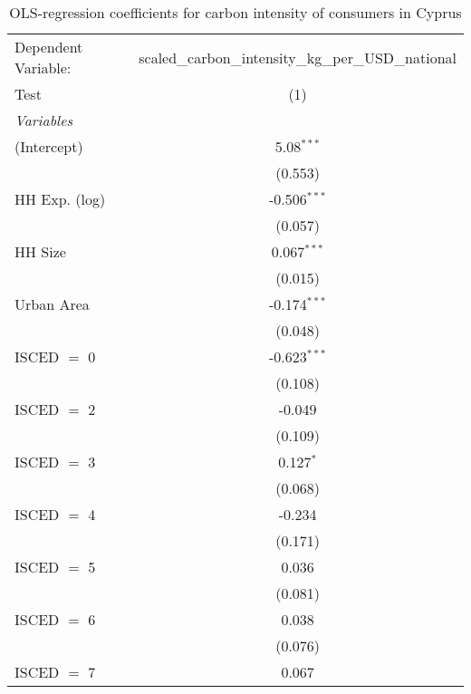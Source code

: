 
\begin{table}[htbp!]
   \centering
   \small
   \begin{adjustbox}{width = 1\textwidth, max height = 0.95\textheight, center}
      \begin{threeparttable}[b]
         \caption{\label{tab:OLS_1_CYP} OLS-regression coefficients for carbon intensity of consumers in Cyprus}
         \begin{tabular}{lc}
            \tabularnewline \midrule \midrule
            Dependent Variable: & scaled\_carbon\_intensity\_kg\_per\_USD\_national\\        
            Test                & (1)\\  
            \midrule
            \emph{Variables}\\
            (Intercept)         & 5.08$^{***}$\\   
                                & (0.553)\\   
            HH Exp. (log)       & -0.506$^{***}$\\   
                                & (0.057)\\   
            HH Size             & 0.067$^{***}$\\   
                                & (0.015)\\   
            Urban Area          & -0.174$^{***}$\\   
                                & (0.048)\\   
            ISCED $=$ 0         & -0.623$^{***}$\\   
                                & (0.108)\\   
            ISCED $=$ 2         & -0.049\\   
                                & (0.109)\\   
            ISCED $=$ 3         & 0.127$^{*}$\\   
                                & (0.068)\\   
            ISCED $=$ 4         & -0.234\\   
                                & (0.171)\\   
            ISCED $=$ 5         & 0.036\\   
                                & (0.081)\\   
            ISCED $=$ 6         & 0.038\\   
                                & (0.076)\\   
            ISCED $=$ 7         & 0.067\\   

\end{tabular}
\end{threeparttable}
\end{adjustbox}
\end{table}
